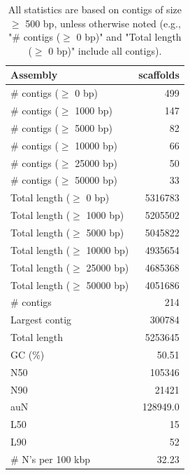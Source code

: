 \documentclass[12pt,a4paper]{article}
\begin{document}
\begin{table}[ht]
\begin{center}
\caption{All statistics are based on contigs of size $\geq$ 500 bp, unless otherwise noted (e.g., "\# contigs ($\geq$ 0 bp)" and "Total length ($\geq$ 0 bp)" include all contigs).}
\begin{tabular}{|l*{1}{|r}|}
\hline
Assembly & scaffolds \\ \hline
\# contigs ($\geq$ 0 bp) & 499 \\ \hline
\# contigs ($\geq$ 1000 bp) & 147 \\ \hline
\# contigs ($\geq$ 5000 bp) & 82 \\ \hline
\# contigs ($\geq$ 10000 bp) & 66 \\ \hline
\# contigs ($\geq$ 25000 bp) & 50 \\ \hline
\# contigs ($\geq$ 50000 bp) & 33 \\ \hline
Total length ($\geq$ 0 bp) & 5316783 \\ \hline
Total length ($\geq$ 1000 bp) & 5205502 \\ \hline
Total length ($\geq$ 5000 bp) & 5045822 \\ \hline
Total length ($\geq$ 10000 bp) & 4935654 \\ \hline
Total length ($\geq$ 25000 bp) & 4685368 \\ \hline
Total length ($\geq$ 50000 bp) & 4051686 \\ \hline
\# contigs & 214 \\ \hline
Largest contig & 300784 \\ \hline
Total length & 5253645 \\ \hline
GC (\%) & 50.51 \\ \hline
N50 & 105346 \\ \hline
N90 & 21421 \\ \hline
auN & 128949.0 \\ \hline
L50 & 15 \\ \hline
L90 & 52 \\ \hline
\# N's per 100 kbp & 32.23 \\ \hline
\end{tabular}
\end{center}
\end{table}
\end{document}
